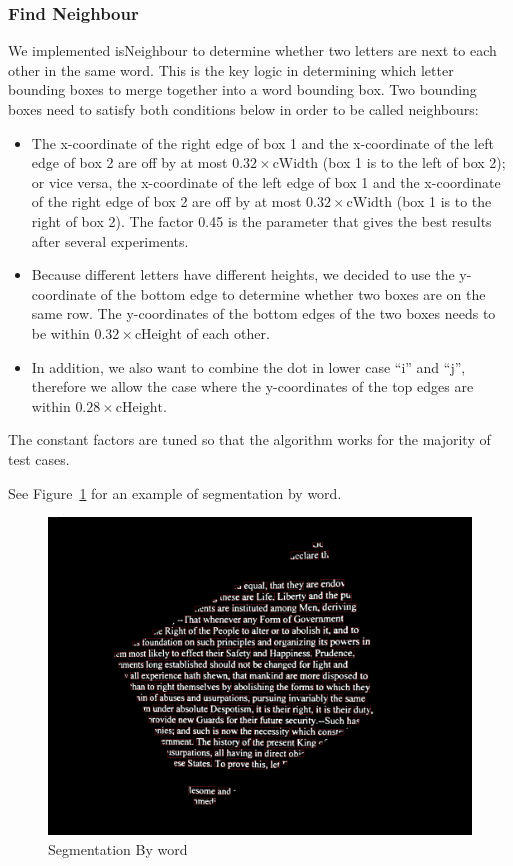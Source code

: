 \documentclass[conference]{IEEEtran}
\begin{document}
\subsubsection{Find Neighbour}
We implemented isNeighbour to determine whether two letters are next to each other in the same word.  This is the key logic in determining which letter bounding boxes to merge together into a word bounding box.  Two bounding boxes need to satisfy both conditions below in order to be called neighbours:
\begin{itemize}
\item The x-coordinate of the right edge of box 1 and the x-coordinate of the left edge of box 2 are off by at most $0.32 \times \mbox{cWidth}$ (box 1 is to the left of box 2); or vice versa, the x-coordinate of the left edge of box 1 and the x-coordinate of the right edge of box 2 are off by at most $0.32 \times \mbox{cWidth}$ (box 1 is to the right of box 2).  The factor 0.45 is the parameter that gives the best results after several experiments.
\item  Because different letters have different heights, we decided to use the y-coordinate of the bottom edge to determine whether two boxes are on the same row.  The y-coordinates of the bottom edges of the two boxes needs to be within $0.32 \times \mbox{cHeight}$ of each other.
\item  In addition, we also want to combine the dot in lower case ``i'' and ``j'', therefore we allow the case where the y-coordinates of the top edges are within $0.28 \times \mbox{cHeight}$.
\end{itemize}
The constant factors are tuned so that the algorithm works for the majority of test cases.

See Figure~\ref{wordbbox} for an example of segmentation by word.

\begin{figure}
\center
\includegraphics[scale=0.10]{word_with_bounding_box.jpg}
\caption{Segmentation By word}
\label{wordbbox}
\end{figure}
\end{document}
